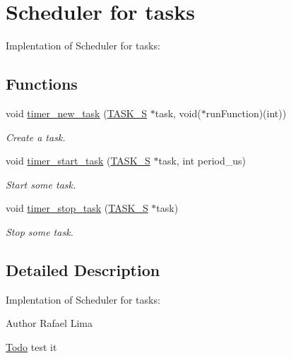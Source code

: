 \hypertarget{group__taskS}{
\section{Scheduler for tasks}
\label{group__taskS}
}


Implentation of Scheduler for tasks:  


\subsection*{Functions}
\begin{DoxyCompactItemize}
\item 
void \hyperlink{group__taskS_ga1e7e694ed290112386d363ee2630dd82}{timer\_\-new\_\-task} (\hyperlink{structTASK__S}{TASK\_\-S} $\ast$task, void($\ast$runFunction)(int))
\begin{DoxyCompactList}\small\item\em Create a task. \item\end{DoxyCompactList}\item 
void \hyperlink{group__taskS_gabb62dbc29029e7950ee72aeb78c83dfc}{timer\_\-start\_\-task} (\hyperlink{structTASK__S}{TASK\_\-S} $\ast$task, int period\_\-us)
\begin{DoxyCompactList}\small\item\em Start some task. \item\end{DoxyCompactList}\item 
void \hyperlink{group__taskS_ga8e48eacaac7d9cf7d82cc71cfbcd4b56}{timer\_\-stop\_\-task} (\hyperlink{structTASK__S}{TASK\_\-S} $\ast$task)
\begin{DoxyCompactList}\small\item\em Stop some task. \item\end{DoxyCompactList}\end{DoxyCompactItemize}


\subsection{Detailed Description}
Implentation of Scheduler for tasks: \begin{DoxyAuthor}{Author}
Rafael Lima 
\end{DoxyAuthor}
\begin{Desc}
\item[\hyperlink{todo__todo000004}{Todo}]test it \end{Desc}


